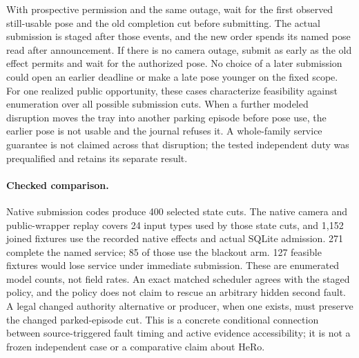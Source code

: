 \documentclass{article}
\begin{document}
With prospective permission and the same outage, wait for the
first observed still-usable pose and the old completion cut before
submitting. The actual submission is staged after those events,
and the new order spends its named pose read after
announcement. If there is no camera outage, submit as early as the
old effect permits and wait for the authorized pose. No choice of
a later submission could open an earlier deadline or make a late
pose younger on the fixed scope. For one realized public opportunity,
these cases characterize feasibility against enumeration over
all possible submission cuts. When a further modeled disruption
moves the tray into another parking episode before pose use,
the earlier pose is not usable and the journal refuses it.
A whole-family service guarantee is not claimed across that
disruption; the tested independent duty was prequalified and
retains its separate result.

\paragraph{Checked comparison.}
Native submission codes produce 400 selected state cuts. The
native camera and public-wrapper replay covers 24 input types
used by those state cuts, and 1,152 joined fixtures use the
recorded native effects and actual SQLite admission.
271 complete the named service; 85 of those use the blackout
arm. 127 feasible fixtures would lose service under immediate
submission. These are enumerated model counts, not field rates.
An exact matched scheduler agrees with the staged policy, and
the policy does not claim to rescue an arbitrary hidden second
fault. A legal changed authority alternative or producer, when
one exists, must preserve the changed parked-episode cut. This
is a concrete conditional connection between source-triggered
fault timing and active evidence accessibility; it is not a
frozen independent case or a comparative claim about HeRo.
\end{document}
